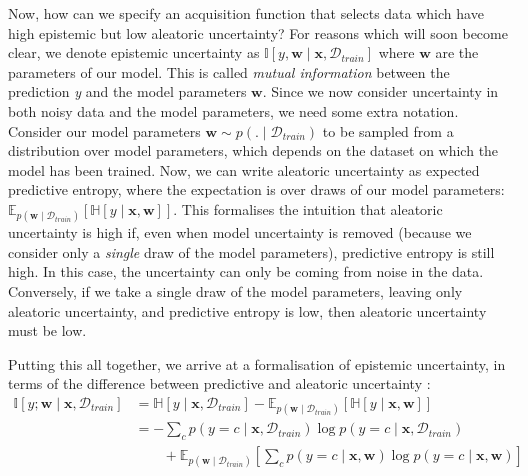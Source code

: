 \documentclass[11pt, a4paper, bibliography=totoc]{report}
\newcommand{\E}[2]{\mathbb{E}_{#1} \left[ #2 \right] }
\newcommand{\data}{\mathcal{D}}
\newcommand{\entropy}[1]{\mathbb{H} \left[ #1 \right] }
\newcommand{\MI}[1]{\mathbb{I} \left[ #1 \right] }
\newcommand{\w}{\mathbf{w}}
\newcommand{\x}{\mathbf{x}}
\begin{document}
Now, how can we specify an acquisition function that selects data which have high epistemic but low aleatoric uncertainty? For reasons which will soon become clear, we denote epistemic uncertainty as $ \MI{y, \w \mid \x, \data_{train}} $ where $ \w $ are the parameters of our model. This is called \textit{mutual information} between the prediction \textit{y} and the model parameters $ \w $. Since we now consider uncertainty in both noisy data and the model parameters, we need some extra notation. Consider our model parameters $ \w \sim p(.\mid \data_{train}) $ to be sampled from a distribution over model parameters, which depends on the dataset on which the model has been trained. Now, we can write aleatoric uncertainty as expected predictive entropy, where the expectation is over draws of our model parameters: $ \E{p(\w \mid \data_{train})}{ \entropy{y \mid \x, \w }} $. This formalises the intuition that aleatoric uncertainty is high if, even when model uncertainty is removed (because we consider only a \textit{single} draw of the model parameters), predictive entropy is still high. In this case, the uncertainty can only be coming from noise in the data. Conversely, if we take a single draw of the model parameters, leaving only aleatoric uncertainty, and predictive entropy is low, then aleatoric uncertainty must be low. %

Putting this all together, we arrive at a formalisation of epistemic uncertainty, in terms of the difference between predictive and aleatoric uncertainty \cite[p.~53]{Gal2017a}:
\begin{align}\label{eq:bald}
\MI{y ; \w \mid \x, \data_{train}} &= \entropy{y \mid \x, \data_{train}} - \E{p(\w \mid \data_{train})}{ \entropy{y \mid \x, \w }} \nonumber \\
&= -\sum_{c} p(y=c \mid \x, \data_{train} ) \log p(y=c \mid \x, \data_{train} ) \nonumber \\ 
&\qquad + \E{p(\w \mid \data_{train})}{\sum_{c} p(y=c \mid \x, \w ) \log p(y=c \mid \x, \w )}
\end{align}
\end{document}

